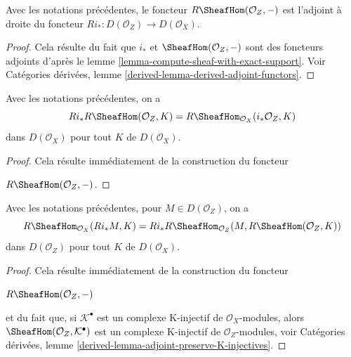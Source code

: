 \begin{lemma}
\label{lemma-sheaf-with-exact-support-adjoint}
Avec les notations précédentes, le foncteur $R\SheafHom(\mathcal{O}_Z, -)$ est l'adjoint à droite du foncteur $Ri_* : D(\mathcal{O}_Z) \to D(\mathcal{O}_X)$.
\end{lemma}

\begin{proof}
Cela résulte du fait que $i_*$ et $\SheafHom(\mathcal{O}_Z, -)$ sont des foncteurs adjoints d'après le lemme \ref{lemma-compute-sheaf-with-exact-support}. Voir Catégories dérivées, lemme \ref{derived-lemma-derived-adjoint-functors}.
\end{proof}

\begin{lemma}
\label{lemma-sheaf-with-exact-support-ext}
Avec les notations précédentes, on a
$$
Ri_*R\SheafHom(\mathcal{O}_Z, K) =
R\SheafHom_{\mathcal{O}_X}(i_*\mathcal{O}_Z, K)
$$
dans $D(\mathcal{O}_X)$ pour tout $K$ de $D(\mathcal{O}_X)$.
\end{lemma}

\begin{proof}
Cela résulte immédiatement de la construction du foncteur
\par\noindent\hfil
$R\SheafHom(\mathcal{O}_Z, -)$.
\hfil\par
\end{proof}

\begin{lemma}
\label{lemma-sheaf-with-exact-support-internal-home}
Avec les notations précédentes, pour $M \in D(\mathcal{O}_Z)$, on a
$$
R\SheafHom_{\mathcal{O}_X}(Ri_*M, K) =
Ri_*R\SheafHom_{\mathcal{O}_Z}(M, R\SheafHom(\mathcal{O}_Z, K))
$$
dans $D(\mathcal{O}_Z)$ pour tout $K$ de $D(\mathcal{O}_X)$.
\end{lemma}

\begin{proof}
Cela résulte immédiatement de la construction du foncteur
\par\noindent\hfil
$R\SheafHom(\mathcal{O}_Z, -)$
\hfil\par\noindent
et du fait que, si $\mathcal{K}^\bullet$ est un complexe K-injectif de $\mathcal{O}_X$-modules, alors $\SheafHom(\mathcal{O}_Z, \mathcal{K}^\bullet)$ est un complexe K-injectif de $\mathcal{O}_Z$-modules, voir Catégories dérivées, lemme \ref{derived-lemma-adjoint-preserve-K-injectives}.
\end{proof}

